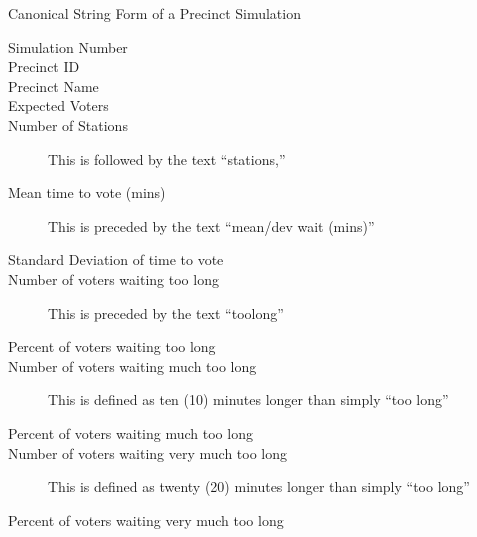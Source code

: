 \begin{table}[!h]
\caption{Canonical String Form of a Precinct Simulation}
\label{hxtk-canon-string-sim}
\begin{description}
\item[Simulation Number]
\item[Precinct ID]
\item[Precinct Name]
\item[Expected Voters]
\item[Number of Stations] This is followed by the text ``stations,''
\item[Mean time to vote (mins)] This is preceded by the text ``mean/dev wait (mins)''
\item[Standard Deviation of time to vote]
\item[Number of voters waiting too long] This is preceded by the text ``toolong''
\item[Percent of voters waiting too long]
\item[Number of voters waiting much too long] This is defined as ten (10) minutes longer than simply ``too long''
\item[Percent of voters waiting much too long]
\item[Number of voters waiting very much too long] This is defined as twenty (20) minutes longer than simply ``too long''
\item[Percent of voters waiting very much too long]
\end{description}
\end{table}